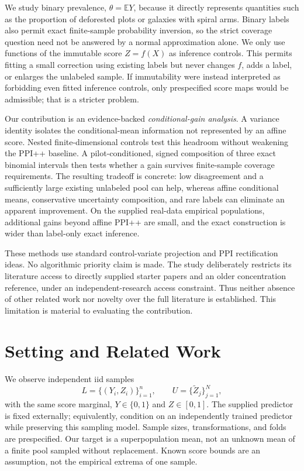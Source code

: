 \documentclass{article}
\newcommand{\E}{\mathbb{E}}
\begin{document}
We study binary prevalence, $\theta=\E Y$, because it directly represents quantities such as the proportion of deforested plots or galaxies with spiral arms. Binary labels also permit exact finite-sample probability inversion, so the strict coverage question need not be answered by a normal approximation alone. We only use functions of the immutable score $Z=f(X)$ as inference controls. This permits fitting a small correction using existing labels but never changes $f$, adds a label, or enlarges the unlabeled sample. If immutability were instead interpreted as forbidding even fitted inference controls, only prespecified score maps would be admissible; that is a stricter problem.

Our contribution is an evidence-backed \emph{conditional-gain analysis}. A variance identity isolates the conditional-mean information not represented by an affine score. Nested finite-dimensional controls test this headroom without weakening the PPI++ baseline. A pilot-conditioned, signed composition of three exact binomial intervals then tests whether a gain survives finite-sample coverage requirements. The resulting tradeoff is concrete: low disagreement and a sufficiently large existing unlabeled pool can help, whereas affine conditional means, conservative uncertainty composition, and rare labels can eliminate an apparent improvement. On the supplied real-data empirical populations, additional gains beyond affine PPI++ are small, and the exact construction is wider than label-only exact inference.

These methods use standard control-variate projection and PPI rectification ideas. No algorithmic priority claim is made. The study deliberately restricts its literature access to directly supplied starter papers and an older concentration reference, under an independent-research access constraint. Thus neither absence of other related work nor novelty over the full literature is established. This limitation is material to evaluating the contribution.

\section{Setting and Related Work}
\label{sec:setting}
We observe independent iid samples
\[
 L=\{(Y_i,Z_i)\}_{i=1}^n,\qquad U=\{\widetilde Z_j\}_{j=1}^N,
\]
with the same score marginal, $Y\in\{0,1\}$ and $Z\in[0,1]$. The supplied predictor is fixed externally; equivalently, condition on an independently trained predictor while preserving this sampling model. Sample sizes, transformations, and folds are prespecified. Our target is a superpopulation mean, not an unknown mean of a finite pool sampled without replacement. Known score bounds are an assumption, not the empirical extrema of one sample.
\end{document}
